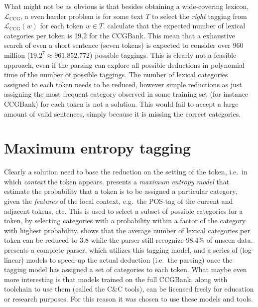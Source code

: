 What might not be as obvious is that besides obtaining a wide-covering lexicon, $\mathcal{L}_\mathrm{CCG}$, a even harder problem is for some text $T$ to select the \emph{right} tagging from $\mathcal{L}_\mathrm{CCG}(w)$ for each token $w \in T$. \citeauthor{ccgBank}  calculate that the expected number of lexical categories per token is 19.2 for the CCGBank. This mean that a exhaustive search of even a short sentence (seven tokens) is expected to consider over 960 million ($19.2^7 \approx 961.852.772$) possible taggings. This is clearly not a feasible approach, even if the parsing can explore all possible deductions in polynomial time of the number of possible taggings. %
The number of lexical categories assigned to each token needs to be reduced, however simple reductions as just assigning the most frequent category  observed in some training set (for instance CCGBank) for each token is not a solution. This would fail to accept a large amount of valid sentences, simply because it is missing the correct categories. 

\section{Maximum entropy tagging}
Clearly a solution need to base the reduction on the setting of the token, i.e.\ in which \emph{context} the token appears. \citeauthor{suppertagging}  presents a \emph{maximum entropy model} that estimate the probability that a token is to be assigned a particular category, given the \emph{features} of the local context, e.g.\ the POS-tag of the current and adjacent tokens, etc. This is used to select a subset of possible categories for a token, by selecting categories with a probability within a factor of the category with highest probability. \citeauthor{suppertagging} shows that the average number of lexical categories per token can be reduced to 3.8 while the parser still recognize 98.4\% of unseen data. \citeauthor{candc}  presents a complete parser, which utilizes this tagging model, and a series of (log-linear) models to speed-up the actual deduction (i.e.\ the parsing) once the tagging model has assigned a set of categories to each token. What maybe even more interesting is that models trained on the full CCGBank, along with toolchain to use them (called the C\&C tools), can be licensed freely for education or research purposes. For this reason it was chosen to use these models and tools.

